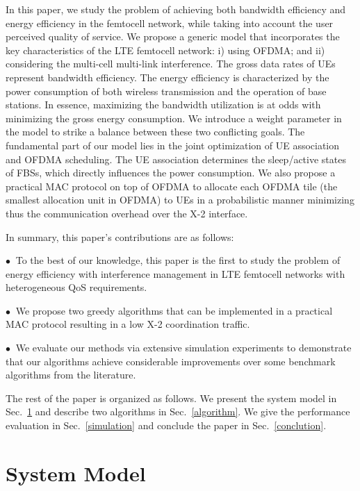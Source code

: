 \documentclass[conference]{IEEEtran}
\newcommand{\myitem}{{\setlength{\parindent}{8pt}\footnotesize{$\bullet~$ }}}
\begin{document}
In this paper, we study the problem of achieving both bandwidth efficiency and energy efficiency in the femtocell network, while taking into account the user perceived quality of service. We propose a generic model that incorporates the key characteristics of the LTE femtocell network: i) using OFDMA; and ii) considering the multi-cell multi-link interference. The gross data rates of UEs represent bandwidth efficiency. The energy efficiency is characterized by the power consumption of both wireless transmission and the operation of base stations. In essence, maximizing the bandwidth utilization is at odds with minimizing the gross energy consumption. We introduce a weight parameter in the model to strike a balance between these two conflicting goals. The fundamental part of our model lies in the joint optimization of UE association and OFDMA scheduling. The UE association determines the sleep/active states of FBSs, which directly influences the power consumption. We also propose a practical MAC protocol on top of OFDMA to allocate each OFDMA tile (the smallest allocation unit in OFDMA) to UEs in a probabilistic manner minimizing thus the communication overhead over the X-2 interface.





In summary, this paper's contributions are as follows:

\myitem To the best of our knowledge, this paper is the first to study the problem of energy efficiency  with interference management in LTE femtocell networks with heterogeneous QoS requirements.

\myitem We propose two greedy algorithms that can be implemented in a practical MAC protocol resulting in a low X-2 coordination traffic.

\myitem We evaluate our methods via extensive simulation experiments to demonstrate that our algorithms achieve considerable improvements over some benchmark algorithms from the literature.



The rest of the paper is organized as follows. We present the system model in Sec.~\ref{model} and describe two algorithms in Sec.~\ref{algorithm}. We give the performance evaluation in Sec.~\ref{simulation} and conclude the paper in Sec.~\ref{conclution}.




\section{System Model}\label{model}
\end{document}
